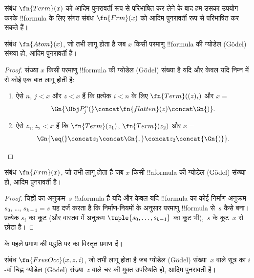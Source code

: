 \documentclass[../../../include/open-logic-section]{subfiles}
\begin{document}

संबंध $\fn{Term}(x)$ को आदिम पुनरावर्ती रूप से परिभाषित कर लेने के बाद हम
उसका उपयोग करके !!{formula} के लिए संगत संबंध $\fn{Frm}(x)$ को आदिम
पुनरावर्ती रूप से परिभाषित कर सकते हैं।

\begin{prop}
संबंध $\fn{Atom}(x)$, जो तभी लागू होता है जब $x$ किसी परमाणु !!{formula} की
ग्योडेल (G\"odel) संख्या हो, आदिम पुनरावर्ती है।
\end{prop}

\begin{proof}
संख्या $x$ किसी परमाणु !!{formula} की ग्योडेल (G\"odel) संख्या है यदि और
केवल यदि निम्न में से कोई एक बात लागू होती है:
\begin{enumerate}
\item ऐसे $n$, $j < x$ और $z < x$ हैं कि प्रत्येक $i < n$ के लिए
  $\fn{Term}((z)_i)$ और $x = $
\[
\Gn{\Obj P^n_j(} \concat \fn{flatten}(z) \concat \Gn{)}.
\]
\item ऐसे $z_1, z_2 < x$ हैं कि $\fn{Term}(z_1)$, $\fn{Term}(z_2)$ और $x = $
\[
\Gn{{\eq}(} \concat z_1 \concat \Gn{,} \concat z_2 \concat{\Gn{)}}.
\]
\end{enumerate}
\end{proof}

\begin{prop}
संबंध $\fn{Frm}(x)$, जो तभी लागू होता है जब $x$ किसी !!a{formula} की ग्योडेल (G\"odel)
 संख्या हो, आदिम पुनरावर्ती है।
\end{prop}

\begin{proof}
चिह्नों का अनुक्रम~$s$ !!a{formula} है यदि और केवल यदि !!{formula} का कोई
निर्माण-अनुक्रम~$s_0$, \dots, $s_{k-1} = s$ यह दर्ज करता है कि निर्माण-नियमों
के अनुसार परमाणु !!{formula} से~$s$ कैसे बना। प्रत्येक $s_i$ का कूट (और
वास्तव में अनुक्रम $\tuple{s_0, \dots, s_{k-1}}$ का कूट भी),~$s$ के कूट~$x$
से छोटा है।
\end{proof}

\begin{prob}
 के पहले प्रमाण की पद्धति पर
 का विस्तृत प्रमाण दें।
\end{prob}

\begin{prop}
संबंध $\fn{FreeOcc}(x, z, i)$, जो तभी लागू होता है जब ग्योडेल (G\"odel)
संख्या~$x$ वाले सूत्र का $i$-वाँ चिह्न ग्योडेल (G\"odel) संख्या~$z$ वाले चर
की मुक्त उपस्थिति हो, आदिम पुनरावर्ती है।
\end{prop}
\end{document}

